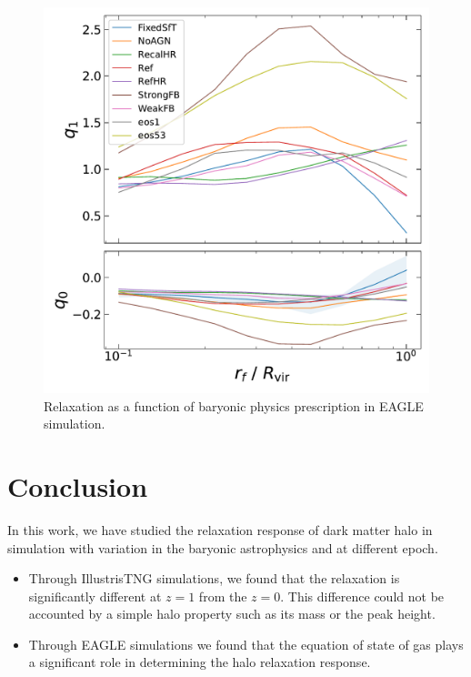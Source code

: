 \begin{figure}[htbp]
\centering
\includegraphics[width=0.7\linewidth]{plots/fit_params_rf_M_E_physvar_fatmass_uniradb.pdf}
\caption[]{Relaxation as a function of baryonic physics prescription in EAGLE simulation.}
\end{figure}


\section{Conclusion}
\label{sec:conclusion}
In this work, we have studied the relaxation response of dark matter halo in simulation with variation in the baryonic astrophysics and at different epoch. 
\begin{itemize}
    \item Through IllustrisTNG simulations, we found that the relaxation is significantly different at $z=1$ from the $z=0$. This difference could not be accounted by a simple halo property such as its mass or the peak height.
    \item Through EAGLE simulations we found that the equation of state of gas plays a significant role in determining the halo relaxation response.
\end{itemize}